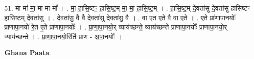 \documentclass[17pt]{extarticle}
\begin{document}
51. मा मा॑ मा॒ मा मा मा᳚ । . मा॒ हा॒सि॒ष्टꣳ॒॒ हा॒सि॒ष्ट॒म् मा॒ मा॒ हा॒सि॒ष्ट॒म् । . हा॒सि॒ष्ट॒म् दे॒वता॑सु दे॒वता॑सु हासिष्टꣳ हासिष्टम् दे॒वता॑सु । . दे॒वता॑सु॒ वै वै दे॒वता॑सु दे॒वता॑सु॒ वै । . वा ए॒त ए॒ते वै वा ए॒ते । . ए॒ते प्रा॑णापा॒नयोः᳚ प्राणापा॒नयो॑ रे॒त ए॒ते प्रा॑णापा॒नयोः᳚ । . प्रा॒णा॒पा॒नयो॒र् व्याय॑च्छन्ते॒ व्याय॑च्छन्ते प्राणापा॒नयोः᳚ प्राणापा॒नयो॒र् व्याय॑च्छन्ते । . प्रा॒णा॒पा॒नयो॒रिति॑ प्राण - अ॒पा॒नयोः᳚ । \newline

\textbf{Ghana Paata } \newline
\end{document}
